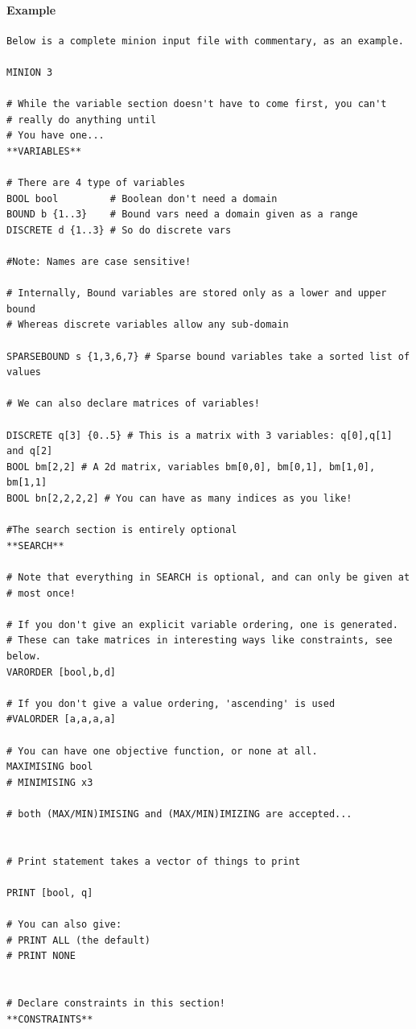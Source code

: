 \documentclass[oneside]{book}
\begin{document}
\paragraph{Example}
{\footnotesize
\begin{verbatim}
Below is a complete minion input file with commentary, as an example.

MINION 3

# While the variable section doesn't have to come first, you can't 
# really do anything until
# You have one...
**VARIABLES**

# There are 4 type of variables
BOOL bool         # Boolean don't need a domain
BOUND b {1..3}    # Bound vars need a domain given as a range
DISCRETE d {1..3} # So do discrete vars

#Note: Names are case sensitive!

# Internally, Bound variables are stored only as a lower and upper bound
# Whereas discrete variables allow any sub-domain

SPARSEBOUND s {1,3,6,7} # Sparse bound variables take a sorted list of values

# We can also declare matrices of variables!

DISCRETE q[3] {0..5} # This is a matrix with 3 variables: q[0],q[1] and q[2]
BOOL bm[2,2] # A 2d matrix, variables bm[0,0], bm[0,1], bm[1,0], bm[1,1]
BOOL bn[2,2,2,2] # You can have as many indices as you like!

#The search section is entirely optional
**SEARCH**

# Note that everything in SEARCH is optional, and can only be given at
# most once!

# If you don't give an explicit variable ordering, one is generated.
# These can take matrices in interesting ways like constraints, see below.
VARORDER [bool,b,d]

# If you don't give a value ordering, 'ascending' is used
#VALORDER [a,a,a,a]

# You can have one objective function, or none at all.
MAXIMISING bool
# MINIMISING x3

# both (MAX/MIN)IMISING and (MAX/MIN)IMIZING are accepted...


# Print statement takes a vector of things to print

PRINT [bool, q]

# You can also give:
# PRINT ALL (the default)
# PRINT NONE


# Declare constraints in this section!
**CONSTRAINTS**


\end{verbatim}}
\end{document}
